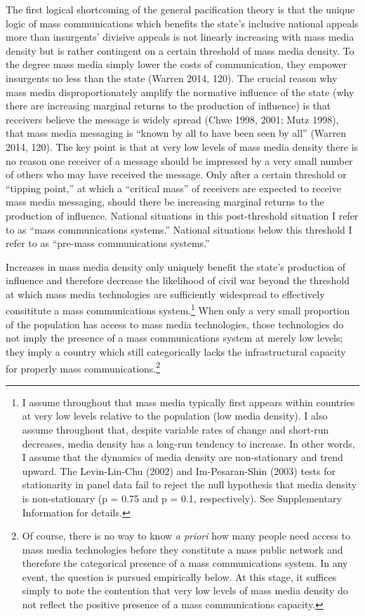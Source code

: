 \documentclass[11pt,article,oneside]{memoir}
\begin{document}
The first logical shortcoming of the general pacification theory is that
the unique logic of mass communications which benefits the state's
inclusive national appeals more than insurgents' divisive appeals is not
linearly increasing with mass media density but is rather contingent on
a certain threshold of mass media density. To the degree mass media
simply lower the costs of communication, they empower insurgents no less
than the state (Warren 2014, 120). The crucial reason why mass media
disproportionately amplify the normative influence of the state (why
there are increasing marginal returns to the production of influence) is
that receivers believe the message is widely spread (Chwe 1998, 2001;
Mutz 1998), that mass media messaging is ``known by all to have been
seen by all'' (Warren 2014, 120). The key point is that at very low
levels of mass media density there is no reason one receiver of a
message should be impressed by a very small number of others who may
have received the message. Only after a certain threshold or ``tipping
point,'' at which a ``critical mass'' of receivers are expected to
receive mass media messaging, should there be increasing marginal
returns to the production of influence. National situations in this
post-threshold situation I refer to as ``mass communications systems.''
National situations below this threshold I refer to as ``pre-mass
communications systems.''

Increases in mass media density only uniquely benefit the state's
production of influence and therefore decrease the likelihood of civil
war beyond the threshold at which mass media technologies are
sufficiently widespread to effectively consititute a mass communications
system.\footnote{I assume throughout that mass media typically first
  appears within countries at very low levels relative to the population
  (low media density). I also assume throughout that, despite variable
  rates of change and short-run decreases, media density has a long-run
  tendency to increase. In other words, I assume that the dynamics of
  media density are non-stationary and trend upward. The Levin-Lin-Chu
  (2002) and Im-Pesaran-Shin (2003) tests for stationarity in panel data
  fail to reject the null hypothesis that media density is
  non-stationary (p = 0.75 and p = 0.1, respectively). See Supplementary
  Information for details.} When only a very small proportion of the
population has access to mass media technologies, those technologies do
not imply the presence of a mass communications system at merely low
levels; they imply a country which still categorically lacks the
infrastructural capacity for properly mass communications.\footnote{Of
  course, there is no way to know \emph{a priori} how many people need
  access to mass media technologies before they constitute a mass public
  network and therefore the categorical presence of a mass
  communications system. In any event, the question is pursued
  empirically below. At this stage, it suffices simply to note the
  contention that very low levels of mass media density do not reflect
  the positive presence of a mass communications capacity.}
\end{document}
